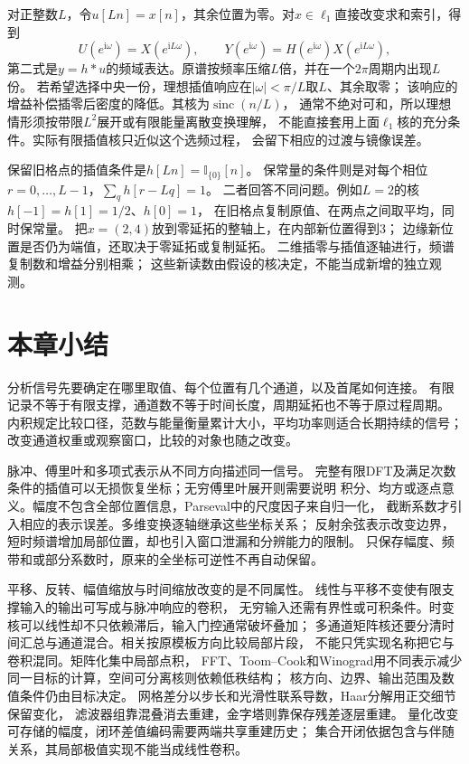 对正整数$L$，令$u[Ln]=x[n]$，其余位置为零。对$x\in\ell_1$直接改变求和索引，得到
\begin{equation}
 U(e^{\mathrm i\omega})=X(e^{\mathrm iL\omega}),\qquad
 Y(e^{\mathrm i\omega})=H(e^{\mathrm i\omega})X(e^{\mathrm iL\omega}),
 \label{eq:signal-upsampling-spectrum}
\end{equation}
第二式是$y=h*u$的频域表达。原谱按频率压缩$L$倍，并在一个$2\pi$周期内出现$L$份。
若希望选择中央一份，理想插值响应在$|\omega|<\pi/L$取$L$、其余取零；
该响应的增益补偿插零后密度的降低。其核为$\operatorname{sinc}(n/L)$，
通常不绝对可和，所以理想情形须按带限$L^2$展开或有限能量离散变换理解，
不能直接套用上面$\ell_1$核的充分条件。实际有限插值核只近似这个选频过程，
会留下相应的过渡与镜像误差。

保留旧格点的插值条件是$h[Ln]=\mathbb I_{\{0\}}[n]$。
保常量的条件则是对每个相位$r=0,\ldots,L-1$，$\sum_qh[r-Lq]=1$。
二者回答不同问题。例如$L=2$的核$h[-1]=h[1]=1/2$、$h[0]=1$，
在旧格点复制原值、在两点之间取平均，同时保常量。
把$x=(2,4)$放到零延拓的整轴上，在内部新位置得到$3$；
边缘新位置是否仍为端值，还取决于零延拓或复制延拓。
二维插零与插值逐轴进行，频谱复制数和增益分别相乘；
这些新读数由假设的核决定，不能当成新增的独立观测。

\section{本章小结}
\label{sec:signal-analysis-summary}

分析信号先要确定在哪里取值、每个位置有几个通道，以及首尾如何连接。
有限记录不等于有限支撑，通道数不等于时间长度，周期延拓也不等于原过程周期。
内积规定比较口径，范数与能量衡量累计大小，平均功率则适合长期持续的信号；
改变通道权重或观察窗口，比较的对象也随之改变。

脉冲、傅里叶和多项式表示从不同方向描述同一信号。
完整有限DFT及满足次数条件的插值可以无损恢复坐标；无穷傅里叶展开则需要说明
积分、均方或逐点意义。幅度不包含全部位置信息，Parseval中的尺度因子来自归一化，
截断系数才引入相应的表示误差。多维变换逐轴继承这些坐标关系；
反射余弦表示改变边界，短时频谱增加局部位置，却也引入窗口泄漏和分辨能力的限制。
只保存幅度、频带和或部分系数时，原来的全坐标可逆性不再自动保留。

平移、反转、幅值缩放与时间缩放改变的是不同属性。
线性与平移不变使有限支撑输入的输出可写成与脉冲响应的卷积，
无穷输入还需有界性或可积条件。时变核可以线性却不只依赖滞后，输入门控通常破坏叠加；
多通道矩阵核还要分清时间汇总与通道混合。相关按原模板方向比较局部片段，
不能只凭实现名称把它与卷积混同。矩阵化集中局部点积，
FFT、Toom--Cook和Winograd用不同表示减少同一目标的计算，空间可分离核则依赖低秩结构；
核方向、边界、输出范围及数值条件仍由目标决定。
网格差分以步长和光滑性联系导数，Haar分解用正交细节保留变化，
滤波器组靠混叠消去重建，金字塔则靠保存残差逐层重建。
量化改变可存储的幅度，闭环差值编码需要两端共享重建历史；
集合开闭依据包含与伴随关系，其局部极值实现不能当成线性卷积。

